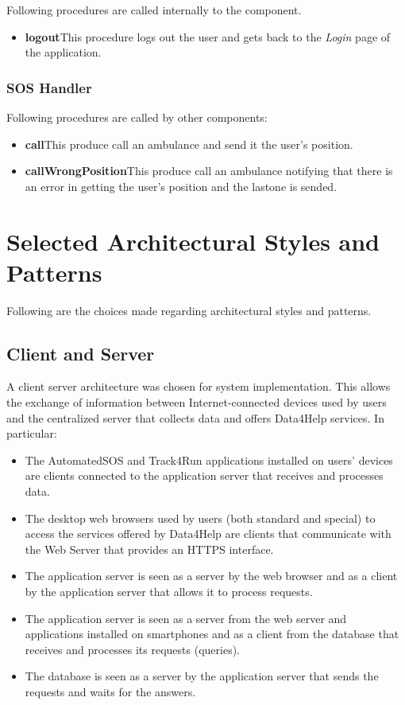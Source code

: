 \myparagraph{}
Following procedures are called internally to the component.
\begin{itemize}
  \item \textbf{logout}\quad This procedure logs out the user and gets back to the \textit{Login} page of the application.
\end{itemize}

\subsubsection{SOS Handler}
Following procedures are called by other components:
\begin{itemize}
  \item \textbf{call}\quad This produce call an ambulance and send it the user's position.
  \item \textbf{callWrongPosition}\quad This produce call an ambulance notifying that there is an error in getting the user's position and the lastone is sended.
\end{itemize}


\section{Selected Architectural Styles and Patterns}\label{architecturalStyle}
Following are the choices made regarding architectural styles and patterns.

\subsection{Client and Server}
A client server architecture was chosen for system implementation.
This allows the exchange of information between Internet-connected devices used by users and the centralized server that collects data and offers Data4Help services.
In particular:
\begin{itemize}
  \item The AutomatedSOS and Track4Run applications installed on users' devices are clients connected to the application server that receives and processes data.
  \item The desktop web browsers used by users (both standard and special) to access the services offered by Data4Help are clients that communicate with the Web Server that provides an HTTPS interface.
  \item The application server is seen as a server by the web browser and as a client by the application server that allows it to process requests.
  \item The application server is seen as a server from the web server and applications installed on smartphones and as a client from the database that receives and processes its requests (queries).
  \item The database is seen as a server by the application server that sends the requests and waits for the answers.
\end{itemize}

